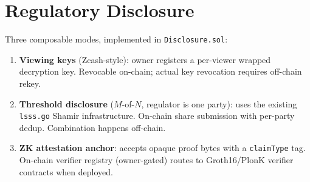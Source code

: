 \section{Regulatory Disclosure}


Three composable modes, implemented in \texttt{Disclosure.sol}:

\begin{enumerate}[nosep]
  \item \textbf{Viewing keys} (Zcash-style): owner registers a
        per-viewer wrapped decryption key. Revocable on-chain; actual
        key revocation requires off-chain rekey.
  \item \textbf{Threshold disclosure} ($M$-of-$N$, regulator is one
        party): uses the existing \texttt{lsss.go} Shamir infrastructure.
        On-chain share submission with per-party dedup. Combination
        happens off-chain.
  \item \textbf{ZK attestation anchor}: accepts opaque proof bytes
        with a \texttt{claimType} tag. On-chain verifier registry
        (owner-gated) routes to Groth16/PlonK verifier contracts when
        deployed.
\end{enumerate}

